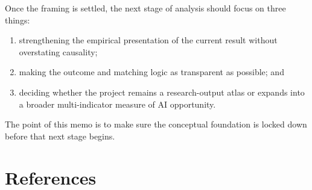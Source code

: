 \documentclass[11pt]{article}
\begin{document}
Once the framing is settled, the next stage of analysis should focus on three things:

\begin{enumerate}[leftmargin=*]
  \item strengthening the empirical presentation of the current result without overstating causality;
  \item making the outcome and matching logic as transparent as possible; and
  \item deciding whether the project remains a research-output atlas or expands into a broader multi-indicator measure of AI opportunity.
\end{enumerate}

The point of this memo is to make sure the conceptual foundation is locked down before that next stage begins.

\section*{References}
\end{document}
